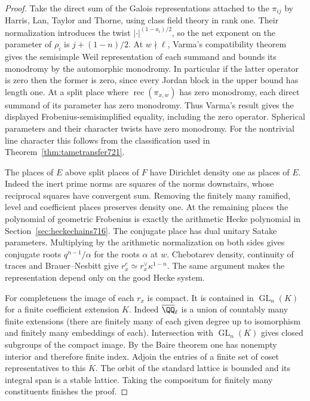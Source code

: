 \documentclass[a4paper,11pt]{article}
\theoremstyle{definition}
\theoremstyle{remark}
\numberwithin{equation}{section}
\newcommand{\GL}{\operatorname{GL}}
\begin{document}
\begin{proof}
Take the direct sum of the Galois representations attached to
the \(\pi_{ij}\) by Harris, Lan, Taylor and Thorne, using class
field theory in rank one. Their normalization introduces the
twist \(|\cdot|^{(1-a_i)/2}\), so the net exponent on the
parameter of \(\rho_i\) is \(j+(1-n)/2\).
At \(w\nmid\ell\), Varma's compatibility theorem gives the
semisimple Weil representation of each summand and bounds
its monodromy by the automorphic monodromy. In particular if
the latter operator is zero then the former is zero, since
every Jordan block in the upper bound has length one.
At a split place where \(\operatorname{rec}(\pi_{x,w})\) has
zero monodromy, each direct summand of its parameter has zero
monodromy. Thus Varma's result gives the displayed
Frobenius-semisimplified equality, including the zero operator.
Spherical parameters and their character twists have zero
monodromy. For the nontrivial line character this follows from
the classification used in Theorem~\ref{thm:tametransfer721}.
~\cite{IX-VII-VII-hltt722}\cite[Thms.~1--2]{IX-VII-VII-varma722}

The places of \(E\) above split places of \(F\) have Dirichlet
density one as places of \(E\). Indeed the inert prime norms
are squares of the norms downstairs, whose reciprocal squares
have convergent sum. Removing the finitely many ramified, level
and coefficient places preserves density one. At the remaining
places the polynomial of geometric Frobenius is exactly the
arithmetic Hecke polynomial in Section~\ref{sec:heckechains716}.
The conjugate place has dual unitary Satake parameters.
Multiplying by the arithmetic normalization on both sides gives
conjugate roots \(q^{n-1}/\alpha\) for the roots \(\alpha\) at \(w\).
Chebotarev density, continuity of traces and Brauer--Nesbitt
give \(r_x^c\simeq r_x^\vee\kappa^{1-n}\). The same argument
makes the representation depend only on the good Hecke system.

For completeness the image of each \(r_x\) is compact. It
is contained in \(\GL_n(K)\) for a finite coefficient extension
\(K\). Indeed \(\overline\QQ_\ell\) is a union of countably many
finite extensions (there are finitely many of each given degree
up to isomorphism and finitely many embeddings of each).
Intersection with \(\GL_n(K)\) gives closed subgroups of the
compact image. By the Baire theorem one has nonempty interior
and therefore finite index. Adjoin the entries of a finite set
of coset representatives to this \(K\). The orbit of the standard
lattice is bounded and its integral span is a stable lattice.
Taking the compositum for finitely many constituents finishes
the proof.
\end{proof}
\end{document}
